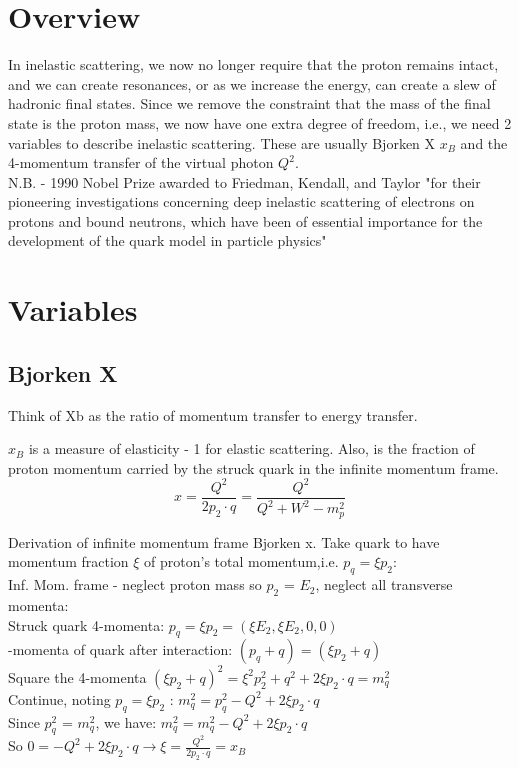     \section{Overview}
        In inelastic scattering, we now no longer require that the proton remains intact, and we can create resonances, or as we increase the energy, can create a slew of hadronic final states. Since we remove the constraint that the mass of the final state is the proton mass, we now have one extra degree of freedom, i.e., we need 2 variables to describe inelastic scattering. These are usually Bjorken X $x_B$ and the 4-momentum transfer of the virtual photon $Q^2$.\\
        N.B. - 1990 Nobel Prize awarded to Friedman, Kendall, and Taylor "for their pioneering investigations concerning deep inelastic scattering of electrons on protons and bound neutrons, which have been of essential importance for the development of the quark model in particle physics"
    \section{Variables}
                
        \subsection{Bjorken X}
        Think of Xb as the ratio of momentum transfer to energy transfer. 
        
        $x_B$ is a measure of elasticity - 1 for elastic scattering. Also, is the fraction of proton momentum carried by the struck quark in the infinite momentum frame.
        \begin{equation}
            x = \frac{Q^2}{2p_2\cdot q} = \frac{Q^2}{Q^2+W^2-m_p^2}
        \end{equation}
    
            Derivation of infinite momentum frame Bjorken x. Take quark to have momentum fraction $\xi$ of proton's total momentum,i.e. $p_q = \xi p_2$:\\
            \indent Inf. Mom. frame - neglect proton mass so $p_2$ = $E_2$, neglect all transverse momenta:\\
            \indent Struck quark 4-momenta: $p_q = \xi p_2 = (\xi E_2, \xi E_2, 0, 0)$\\
            -momenta of quark after interaction: $(p_q + q) = (\xi p_2 +q)$\\
            \indent Square the 4-momenta $(\xi p_2 +q)^2 = \xi^2 p_2^2 +q^2 + 2\xi p_2 \cdot q  = m_q^2$\\
            \indent Continue, noting $p_q = \xi p_2$ : $m_q^2 = p_q^2 - Q^2 + 2 \xi p_2 \cdot q$\\
            \indent Since $p_q^2$ = $m_q^2$, we have: $m_q^2 = m_q^2 -Q^2 + 2 \xi p_2 \cdot q$\\
            \indent So $0 = -Q^2 + 2\xi p_2 \cdot q \longrightarrow \xi = \frac{Q^2}{2 p_2 \cdot q} = x_B$\\
        
